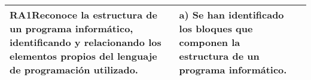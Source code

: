 \documentclass{article}
\begin{document}
\begin{longtable}{|p{3.5cm}|p{10cm}|c|}
\hline
\multirow{1}{=}{\textbf{RA1}\newline Reconoce la estructura de un programa informático, identificando y relacionando los elementos propios del lenguaje de programación utilizado. \label{RA1}}
 &  a) Se han identificado los bloques que componen la estructura de un programa informático. \label{RA1:CEa} & \\
\hline
\end{longtable}
\end{document}
